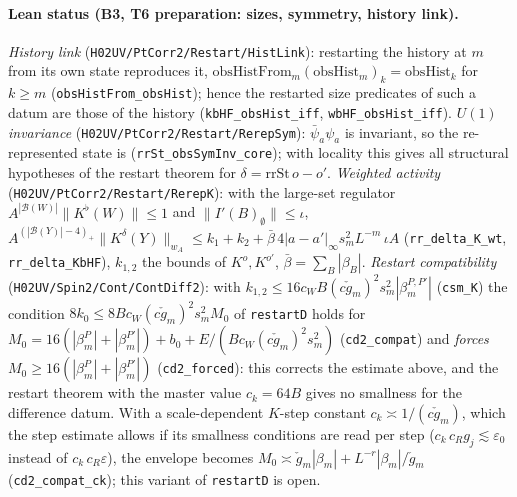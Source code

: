 \documentclass[11pt]{amsart}
\theoremstyle{definition}
\theoremstyle{remark}
\numberwithin{equation}{section}
\begin{document}
\paragraph{Lean status (B3, T6 preparation: sizes, symmetry, history link).}
\emph{History link} (\texttt{H02UV/PtCorr2/Restart/HistLink}): restarting the history at $m$ from its own state reproduces it,
$\mathrm{obsHistFrom}_m(\mathrm{obsHist}_m)_k=\mathrm{obsHist}_k$ for $k\ge m$ (\texttt{obsHistFrom\_obsHist}); hence
the restarted size predicates of such a datum are those of the history (\texttt{kbHF\_obsHist\_iff},
\texttt{wbHF\_obsHist\_iff}).
\emph{$U(1)$ invariance} (\texttt{H02UV/PtCorr2/Restart/RerepSym}): $\bar\psi_a\psi_a$ is invariant, so the re-represented state is
(\texttt{rrSt\_obsSymInv\_core}); with locality this gives all structural hypotheses of the restart theorem for
$\delta=\mathrm{rrSt}\,o-o'$.
\emph{Weighted activity} (\texttt{H02UV/PtCorr2/Restart/RerepK}): with the large-set regulator $A^{|\mathcal B(W)|}\|K^\flat(W)\|\le1$
and $\|I'(B)_\emptyset\|\le\iota$,
$A^{(|\mathcal B(Y)|-4)_+}\|K^\delta(Y)\|_{w_A}\le k_1+k_2+\bar\beta\,4|a-a'|_\infty s_m^2L^{-m}\,\iota A$
(\texttt{rr\_delta\_K\_wt}, \texttt{rr\_delta\_KbHF}), $k_{1,2}$ the bounds of $K^{o},K^{o'}$, $\bar\beta=\sum_B|\beta_B|$.
\emph{Restart compatibility} (\texttt{H02UV/Spin2/Cont/ContDiff2}): with $k_{1,2}\le16c_WB(c\check g_m)^2s_m^2|\beta^{P,P'}_m|$
(\texttt{csm\_K}) the condition $8k_0\le8Bc_W(c\check g_m)^2s_m^2M_0$ of \texttt{restartD} holds for
$M_0=16(|\beta^P_m|+|\beta^{P'}_m|)+b_0+E/(Bc_W(c\check g_m)^2s_m^2)$ (\texttt{cd2\_compat}) and \emph{forces}
$M_0\ge16(|\beta^P_m|+|\beta^{P'}_m|)$ (\texttt{cd2\_forced}): this corrects the estimate above, and the restart theorem
with the master value $c_k=64B$ gives no smallness for the difference datum. With a scale-dependent
$K$-step constant $c_k\asymp1/(c\check g_m)$, which the step estimate allows if its smallness conditions are read per step
($c_k\,c_R g_j\lesssim\varepsilon_0$ instead of $c_k\,c_R\varepsilon$), the envelope becomes
$M_0\asymp\check g_m|\beta_m|+L^{-r}|\beta_m|/\check g_m$ (\texttt{cd2\_compat\_ck}); this variant of
\texttt{restartD} is open.
\end{document}
